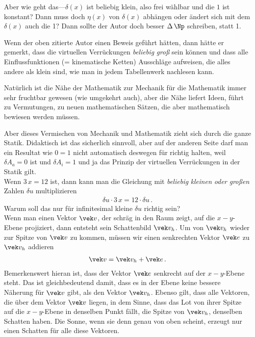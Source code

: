 {Aber wie geht das---$\delta(x)$ ist beliebig klein, also frei w\"{a}hlbar und die $1$ ist konstant? Dann muss doch $\eta(x)$ von $\delta(x)$ abh\"{a}ngen oder \"{a}ndert sich mit dem $\delta(x)$ auch die 1? Dann sollte der Autor doch besser $\Delta\,\Np$ schreiben, statt 1.


Wenn der oben zitierte Autor einen Beweis gef\"{u}hrt h\"{a}tten, dann h\"{a}tte er gemerkt, dass die virtuellen Verr\"{u}ckungen {\em beliebig gro{\ss}\/} sein k\"{o}nnen und dass alle Einflussfunktionen (= kinematische Ketten) Ausschl\"{a}ge aufweisen, die alles andere als klein sind, wie man in jedem Tabellenwerk nachlesen kann.


Nat\"{u}rlich ist die N\"{a}he der Mathematik zur Mechanik f\"{u}r die Mathematik immer sehr fruchtbar gewesen (wie umgekehrt auch), aber die N\"{a}he liefert Ideen, f\"{u}hrt zu Vermutungen, zu neuen mathematischen S\"{a}tzen, die aber mathematisch bewiesen werden m\"{u}ssen.

Aber dieses Vermischen von Mechanik und Mathematik zieht sich durch die ganze Statik. Didaktisch ist das sicherlich sinnvoll, aber auf der anderen Seite darf man ein Resultat wie $0 = 1$ nicht automatisch deswegen f\"{u}r richtig halten, weil $\delta A_a = 0$ ist und $\delta A_i = 1$ und ja das Prinzip der virtuellen Verr\"{u}ckungen in der Statik gilt.\\


Wenn $3\,x = 12$ ist, dann kann man die Gleichung mit {\em beliebig kleinen oder gro{\ss}en \/} Zahlen $\delta u$ multiplizieren
\begin{align}
\delta u \cdot 3\,x = 12 \cdot \delta u\,.
\end{align}
Warum soll das nur f\"{u}r infinitesimal kleine $\delta u$ richtig sein?\\


Wenn man einen Vektor $\vek v$, der schr\"{a}g in den Raum zeigt, auf die $x-y$-Ebene projiziert, dann entsteht sein Schattenbild $\vek v_h$.
Um von $\vek v_h$ wieder zur Spitze von $\vek v$ zu kommen, m\"{u}ssen wir einen senkrechten Vektor $\vek e$ zu $\vek v_h$ addieren
\begin{align}
\vek v = \vek v_h + \vek e\,.
\end{align}
Bemerkenswert hieran ist, dass der Vektor  $\vek e$ senkrecht auf der  $x-y$-Ebene steht. Das ist gleichbedeutend damit, dass es in der Ebene keine bessere N\"{a}herung f\"{u}r  $\vek v$ gibt, als den Vektor $\vek v_h$. Ebenso gilt, dass alle Vektoren, die \"{u}ber dem Vektor $\vek v$ liegen, in dem Sinne, dass das Lot von ihrer Spitze auf die $x-y$-Ebene in denselben Punkt f\"{a}llt, die Spitze von $\vek v_h$, denselben Schatten haben. Die Sonne, wenn sie denn genau von oben scheint, erzeugt nur einen Schatten f\"{u}r alle diese Vektoren.

}
